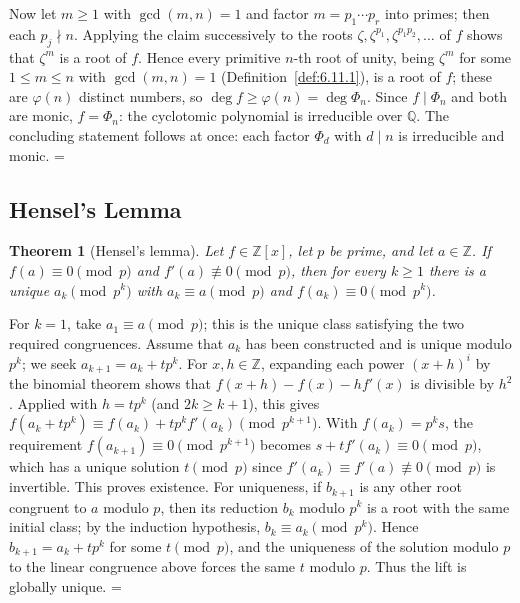 \documentclass[11pt]{article}
\makeatletter
\let\nt@closedisplay\]
\def\nt@guardedclose{\@ifnextchar\par{\nt@closeafterpar}{\@ifnextchar\end{\postdisplaypenalty\@M\nt@closedisplay}{\nt@closedisplay}}}
\def\nt@closeafterpar\par{\@ifnextchar\par{\nt@closeafterpar}{\@ifnextchar\end{\postdisplaypenalty\@M\nt@closedisplay\par}{\nt@closedisplay\par}}}
\renewenvironment{proof}[1][\proofname]{\par
  \pushQED{\qed}\normalfont\topsep\medskipamount\edef\nt@afterproof{\@endparpenalty=\the\@endparpenalty\relax}\@beginparpenalty\@M\@endparpenalty\@M\let\]\nt@guardedclose\trivlist\item[]\textit{#1\@addpunct{.}} \ignorespaces}{\ifvmode\addpenalty\@M\fi\popQED\nt@afterproof\endtrivlist\@endpefalse}
\theoremstyle{ntstyle}
\newtheorem{theorem}{Theorem}[subsection]
\makeatother
\begin{document}
\begin{proof}
  Now let $m\ge1$ with $\gcd(m, n) = 1$ and factor $m = p_1\cdots p_r$
  into primes; then each $p_j\nmid n$. Applying the claim successively to
  the roots $\zeta, \zeta^{p_1}, \zeta^{p_1p_2}, \ldots$ of $f$ shows
  that $\zeta^{m}$ is a root of $f$. Hence every primitive $n$-th root
  of unity, being $\zeta^{m}$ for some $1\le m\le n$ with $\gcd(m,n)=1$ (Definition~\ref{def:6.11.1}), is a root of
  $f$; these are $\varphi(n)$ distinct numbers, so $\deg f\ge\varphi(n) = \deg\Phi_n$.
  Since $f\mid\Phi_n$ and both are monic, $f = \Phi_n$: the cyclotomic
  polynomial is irreducible over $\mathbb{Q}$. The concluding
  statement follows at once: each factor $\Phi_d$ with $d\mid n$ is
  irreducible and monic.
\end{proof}
\subsection{Hensel's Lemma}

\begin{theorem}[Hensel's lemma]\label{thm:11.4.1}\label{thm:hensel-lemma} Let
  $f\in\mathbb{Z}[x]$, let $p$ be prime, and let $a\in\mathbb{Z}$. If
  $f(a)\equiv0\pmod{p}$ and
  $f'(a)\not\equiv0\pmod{p}$, then for every $k\ge1$ there is a unique
  $a_k\pmod{p^k}$ with $a_k\equiv a\pmod{p}$ and $f(a_k)\equiv0\pmod{p^k}$.

\end{theorem}

\begin{proof} For $k=1$, take $a_1\equiv a\pmod{p}$; this is the unique
  class satisfying the two required congruences. Assume that $a_k$ has
  been constructed and is unique modulo $p^k$; we seek $a_{k+1}=a_k+tp^k$.
  For $x,h\in\mathbb{Z}$, expanding each power $(x+h)^i$ by the
  binomial theorem shows that
  $f(x+h)-f(x)-hf'(x)$ is divisible by $h^2$. Applied with
  $h=tp^k$ (and $2k\ge k+1$), this gives
  $f(a_k + tp^k)\equiv f(a_k) + t p^k f'(a_k)\pmod{p^{k+1}}$. With $f(a_k) = p^k s$, the
  requirement $f(a_{k+1})\equiv0\pmod{p^{k+1}}$ becomes $s + t f'(a_k)\equiv0\pmod{p}$, which has a unique solution
  $t\pmod{p}$ since
  $f'(a_k)\equiv f'(a)\not\equiv0\pmod{p}$ is invertible. This proves existence. For uniqueness, if $b_{k+1}$ is
  any other root congruent to $a$ modulo $p$, then its reduction $b_k$ modulo $p^k$ is a root with the same initial
  class; by the induction hypothesis, $b_k\equiv a_k\pmod{p^k}$. Hence $b_{k+1}=a_k+tp^k$ for some $t\pmod{p}$, and
  the uniqueness of the solution modulo $p$ to the linear congruence above forces the same $t$ modulo $p$. Thus the
  lift is globally unique.
\end{proof}
\end{document}
